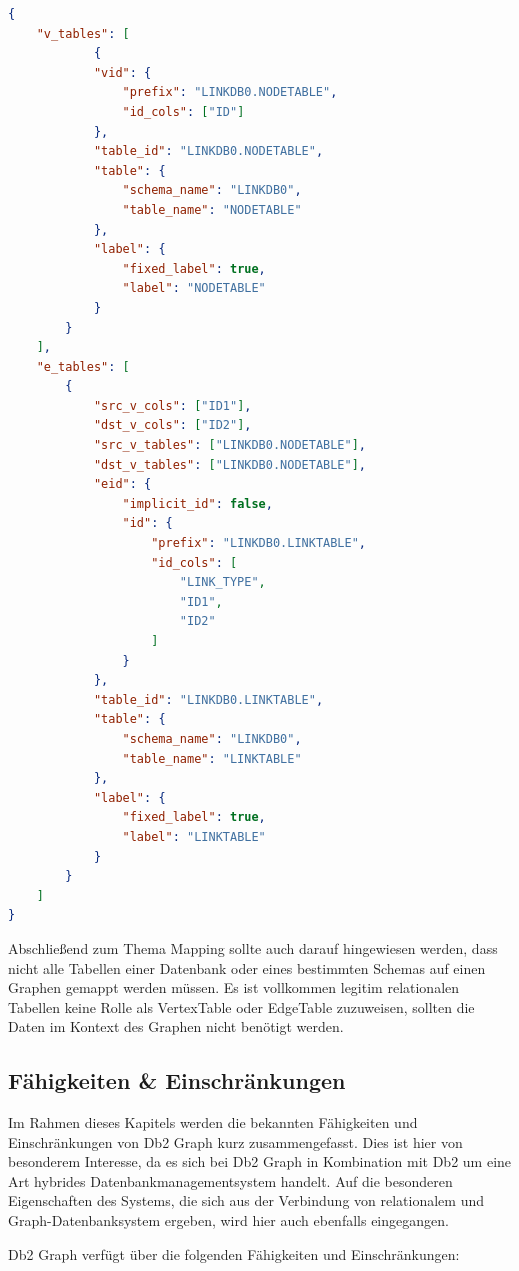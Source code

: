 \begin{lstlisting}[caption={Beispiel Auschnitt Mapping Konfiguration},language=json,label=src:mapping_example]
{
    "v_tables": [
            {
            "vid": {
                "prefix": "LINKDB0.NODETABLE",
                "id_cols": ["ID"]
            },
            "table_id": "LINKDB0.NODETABLE",
            "table": {
                "schema_name": "LINKDB0",
                "table_name": "NODETABLE"
            },
            "label": {
                "fixed_label": true,
                "label": "NODETABLE"
            }
        }
    ],
    "e_tables": [
        {
            "src_v_cols": ["ID1"],
            "dst_v_cols": ["ID2"],
            "src_v_tables": ["LINKDB0.NODETABLE"],
            "dst_v_tables": ["LINKDB0.NODETABLE"],
            "eid": {
                "implicit_id": false,
                "id": {
                    "prefix": "LINKDB0.LINKTABLE",
                    "id_cols": [
                        "LINK_TYPE",
                        "ID1",
                        "ID2"
                    ]
                }
            },
            "table_id": "LINKDB0.LINKTABLE",
            "table": {
                "schema_name": "LINKDB0",
                "table_name": "LINKTABLE"
            },
            "label": {
                "fixed_label": true,
                "label": "LINKTABLE"
            }
        }
    ]
}
\end{lstlisting}

Abschließend zum Thema Mapping sollte auch darauf hingewiesen werden, dass nicht alle Tabellen einer Datenbank oder eines bestimmten Schemas auf einen Graphen gemappt werden müssen. Es ist vollkommen legitim relationalen Tabellen keine Rolle als VertexTable oder EdgeTable zuzuweisen, sollten die Daten im Kontext des Graphen nicht benötigt werden. 

\subsection{Fähigkeiten \& Einschränkungen}
Im Rahmen dieses Kapitels werden die bekannten Fähigkeiten und Einschränkungen von Db2 Graph kurz zusammengefasst. Dies ist hier von besonderem Interesse, da es sich bei Db2 Graph in Kombination mit Db2 um eine Art hybrides Datenbankmanagementsystem handelt. Auf die besonderen Eigenschaften des Systems, die sich aus der Verbindung von relationalem und Graph-Datenbanksystem ergeben, wird hier auch ebenfalls eingegangen. 

Db2 Graph verfügt über die folgenden Fähigkeiten und Einschränkungen:

